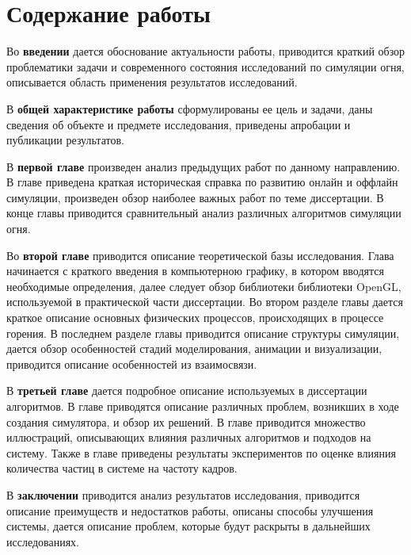 \part*{Содержание работы}

Во \textbf{введении} дается обоснование актуальности работы, приводится краткий
обзор проблематики задачи и современного состояния исследований по симуляции
огня, описывается область применения результатов исследований.

В \textbf{общей характеристике работы} сформулированы ее цель и задачи, даны
сведения об объекте и предмете исследования, приведены апробации и публикации
результатов.

В \textbf{первой главе} произведен анализ предыдущих работ по данному
направлению. В главе приведена краткая историческая справка по развитию онлайн и
оффлайн симуляции, произведен обзор наиболее важных работ по теме диссертации. В
конце главы приводится сравнительный анализ различных алгоритмов симуляции огня.

Во \textbf{второй главе} приводится описание теоретической базы исследования.
Глава начинается с краткого введения в компьютерною графику, в котором
вводятся необходимые определения, далее следует обзор библиотеки библиотеки
OpenGL, используемой в практической части диссертации. Во втором разделе главы
дается краткое описание основных физических процессов, происходящих в процессе
горения. В последнем разделе главы приводится описание структуры симуляции,
дается обзор особенностей стадий моделирования, анимации и визуализации,
приводится описание особенностей из взаимосвязи.

В \textbf{третьей главе} дается подробное описание используемых в диссертации
алгоритмов. В главе приводятся описание различных проблем, возникших в ходе
создания симулятора, и обзор их решений. В главе приводится множество
иллюстраций, описывающих влияния различных алгоритмов и подходов на систему.
Также в главе приведены результаты экспериментов по оценке влияния количества
частиц в системе на частоту кадров.

В \textbf{заключении} приводится анализ результатов исследования, приводится
описание преимуществ и недостатков работы, описаны способы улучшения системы,
дается описание проблем, которые будут раскрыты в дальнейших исследованиях.
